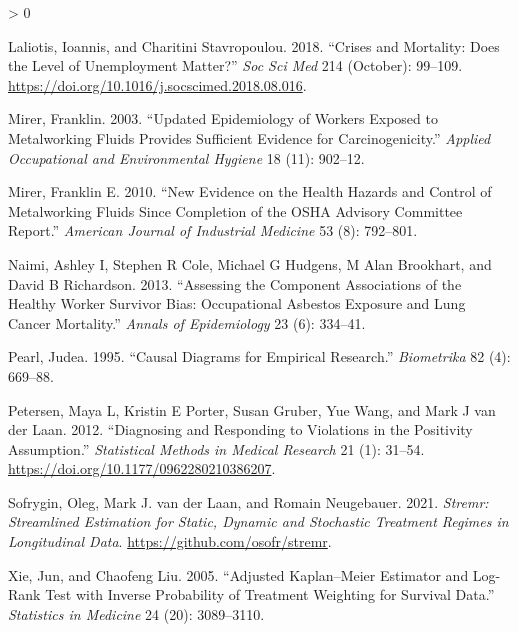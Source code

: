 \documentclass[
  11pt,
]{article}
\newlength{\cslhangindent}
\newenvironment{CSLReferences}[2] %
 {%
  \setlength{\parindent}{0pt}
  \ifodd #1 \everypar{\setlength{\hangindent}{\cslhangindent}}\ignorespaces\fi
  \ifnum #2 > 0
  \setlength{\parskip}{#2\baselineskip}
  \fi
 }%
 {}
\begin{document}
\begin{CSLReferences}{1}{0}
\leavevmode\hypertarget{ref-Laliotis_2018}{}%
Laliotis, Ioannis, and Charitini Stavropoulou. 2018. {``Crises and
Mortality: Does the Level of Unemployment Matter?''} \emph{Soc Sci Med}
214 (October): 99--109.
\url{https://doi.org/10.1016/j.socscimed.2018.08.016}.

\leavevmode\hypertarget{ref-Mirer_2003}{}%
Mirer, Franklin. 2003. {``Updated Epidemiology of Workers Exposed to
Metalworking Fluids Provides Sufficient Evidence for Carcinogenicity.''}
\emph{Applied Occupational and Environmental Hygiene} 18 (11): 902--12.

\leavevmode\hypertarget{ref-Mirer_2010}{}%
Mirer, Franklin E. 2010. {``New Evidence on the Health Hazards and
Control of Metalworking Fluids Since Completion of the OSHA Advisory
Committee Report.''} \emph{American Journal of Industrial Medicine} 53
(8): 792--801.

\leavevmode\hypertarget{ref-Naimi_2013}{}%
Naimi, Ashley I, Stephen R Cole, Michael G Hudgens, M Alan Brookhart,
and David B Richardson. 2013. {``Assessing the Component Associations of
the Healthy Worker Survivor Bias: Occupational Asbestos Exposure and
Lung Cancer Mortality.''} \emph{Annals of Epidemiology} 23 (6): 334--41.

\leavevmode\hypertarget{ref-Pearl_1995}{}%
Pearl, Judea. 1995. {``Causal Diagrams for Empirical Research.''}
\emph{Biometrika} 82 (4): 669--88.

\leavevmode\hypertarget{ref-Petersen_2012}{}%
Petersen, Maya L, Kristin E Porter, Susan Gruber, Yue Wang, and Mark J
van der Laan. 2012. {``Diagnosing and Responding to Violations in the
Positivity Assumption.''} \emph{Statistical Methods in Medical Research}
21 (1): 31--54. \url{https://doi.org/10.1177/0962280210386207}.

\leavevmode\hypertarget{ref-Sofrygin_2021}{}%
Sofrygin, Oleg, Mark J. van der Laan, and Romain Neugebauer. 2021.
\emph{Stremr: Streamlined Estimation for Static, Dynamic and Stochastic
Treatment Regimes in Longitudinal Data}.
\url{https://github.com/osofr/stremr}.

\leavevmode\hypertarget{ref-Xie_2005}{}%
Xie, Jun, and Chaofeng Liu. 2005. {``Adjusted Kaplan--Meier Estimator
and Log-Rank Test with Inverse Probability of Treatment Weighting for
Survival Data.''} \emph{Statistics in Medicine} 24 (20): 3089--3110.

\end{CSLReferences}
\end{document}
